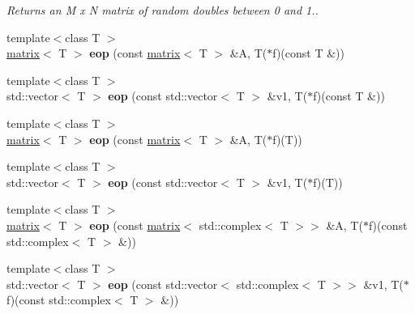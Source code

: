 \begin{DoxyCompactItemize}
\begin{DoxyCompactList}\small\item\em Returns an M x N matrix of random doubles between 0 and 1.. \end{DoxyCompactList}\item 
\hypertarget{namespacekeycpp_aae90693acdaf666bd23bf861f2c0d28c}{{\footnotesize template$<$class T $>$ }\\\hyperlink{classkeycpp_1_1matrix}{matrix}$<$ T $>$ {\bfseries eop} (const \hyperlink{classkeycpp_1_1matrix}{matrix}$<$ T $>$ \&A, T($\ast$f)(const T \&))}\label{namespacekeycpp_aae90693acdaf666bd23bf861f2c0d28c}

\item 
\hypertarget{namespacekeycpp_a1122e5d4ae4b58fc150352b5d38d2cdb}{{\footnotesize template$<$class T $>$ }\\std\-::vector$<$ T $>$ {\bfseries eop} (const std\-::vector$<$ T $>$ \&v1, T($\ast$f)(const T \&))}\label{namespacekeycpp_a1122e5d4ae4b58fc150352b5d38d2cdb}

\item 
\hypertarget{namespacekeycpp_a3a1ba458353cfecef659b40e446baaf0}{{\footnotesize template$<$class T $>$ }\\\hyperlink{classkeycpp_1_1matrix}{matrix}$<$ T $>$ {\bfseries eop} (const \hyperlink{classkeycpp_1_1matrix}{matrix}$<$ T $>$ \&A, T($\ast$f)(T))}\label{namespacekeycpp_a3a1ba458353cfecef659b40e446baaf0}

\item 
\hypertarget{namespacekeycpp_ad7d9f15708903bc3f2c6d26693b8872d}{{\footnotesize template$<$class T $>$ }\\std\-::vector$<$ T $>$ {\bfseries eop} (const std\-::vector$<$ T $>$ \&v1, T($\ast$f)(T))}\label{namespacekeycpp_ad7d9f15708903bc3f2c6d26693b8872d}

\item 
\hypertarget{namespacekeycpp_a5afc215befa38bf47fb52cff33794ebe}{{\footnotesize template$<$class T $>$ }\\\hyperlink{classkeycpp_1_1matrix}{matrix}$<$ T $>$ {\bfseries eop} (const \hyperlink{classkeycpp_1_1matrix}{matrix}$<$ std\-::complex$<$ T $>$$>$ \&A, T($\ast$f)(const std\-::complex$<$ T $>$ \&))}\label{namespacekeycpp_a5afc215befa38bf47fb52cff33794ebe}

\item 
\hypertarget{namespacekeycpp_ad33e9ccd4e31c7c63d31af13d44312e8}{{\footnotesize template$<$class T $>$ }\\std\-::vector$<$ T $>$ {\bfseries eop} (const std\-::vector$<$ std\-::complex$<$ T $>$$>$ \&v1, T($\ast$f)(const std\-::complex$<$ T $>$ \&))}\label{namespacekeycpp_ad33e9ccd4e31c7c63d31af13d44312e8}


\end{DoxyCompactItemize}
